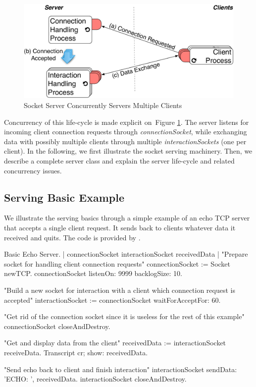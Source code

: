 \documentclass[a4paper,10pt,twoside]{book}
\begin{document}
\begin{figure}[ht]\centering
	\includegraphics[width=.75\linewidth]{tcpSocketServerLifeCycle}
	\caption{Socket Server Concurrently Servers Multiple Clients}
	\label{fig:socketServerLifeCycle}
\end{figure}

Concurrency of this life-cycle is made explicit on~Figure \ref{fig:socketServerLifeCycle}.
The server listens for incoming client connection requests through \textit{connectionSocket}, while exchanging data with possibly multiple clients through multiple \textit{interactionSockets} (one per client).
In the following, we first illustrate the socket serving machinery.
Then, we describe a complete server class and explain the server life-cycle and related concurrency issues.

\subsection{Serving Basic Example}
We illustrate the serving basics through a simple example of an echo TCP server that accepts a single client request.
It sends back to clients whatever data it received and quits.
The code is provided by .

\begin{script}[servingBasicExample]{Basic Echo Server.}
| connectionSocket interactionSocket receivedData |
"Prepare socket for handling client connection requests"
connectionSocket := Socket newTCP.
connectionSocket listenOn: 9999 backlogSize: 10.

"Build a new socket for interaction with a client which connection request is accepted"
interactionSocket := connectionSocket waitForAcceptFor: 60.

"Get rid of the connection socket since it is useless for the rest of this example"
connectionSocket closeAndDestroy.

"Get and display data from the client"
receivedData := interactionSocket receiveData.
Transcript cr; show: receivedData.

"Send echo back to client and finish interaction"
interactionSocket sendData: 'ECHO: ', receivedData.
interactionSocket closeAndDestroy.
\end{script}
\end{document}
